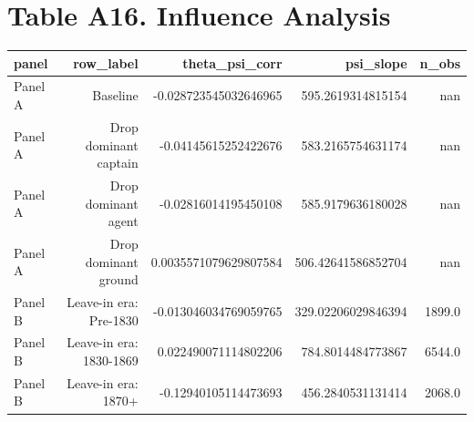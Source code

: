 \documentclass{article}
\begin{document}
\section*{Table A16. Influence Analysis}
\begin{tabular}{lrrrr}
\hline
panel & row_label & theta_psi_corr & psi_slope & n_obs \\
\hline
Panel A & Baseline & -0.028723545032646965 & 595.2619314815154 & nan \\
Panel A & Drop dominant captain & -0.04145615252422676 & 583.2165754631174 & nan \\
Panel A & Drop dominant agent & -0.02816014195450108 & 585.9179636180028 & nan \\
Panel A & Drop dominant ground & 0.0035571079629807584 & 506.42641586852704 & nan \\
Panel B & Leave-in era: Pre-1830 & -0.013046034769059765 & 329.02206029846394 & 1899.0 \\
Panel B & Leave-in era: 1830-1869 & 0.022490071114802206 & 784.8014484773867 & 6544.0 \\
Panel B & Leave-in era: 1870+ & -0.12940105114473693 & 456.2840531131414 & 2068.0 \\
\hline
\end{tabular}
\end{document}
